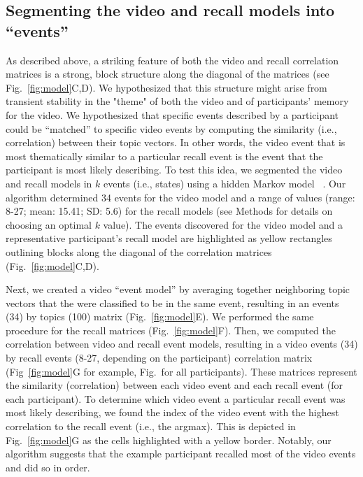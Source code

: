 \subsection*{Segmenting the video and recall models into ``events''}
As described above, a striking feature of both the video and recall correlation matrices is a strong, block structure along the diagonal of the matrices (see Fig.~\ref{fig:model}C,D).  We hypothesized that this structure might arise from transient stability in the "theme" of both the video and of participants' memory for the video. We hypothesized that specific events described by a participant could be ``matched'' to specific video events by computing the similarity (i.e., correlation) between their topic vectors. In other words, the video event that is most thematically similar to a particular recall event is the event that the participant is most likely describing. To test this idea, we segmented the video and recall models in $k$ events (i.e., states) using a hidden Markov model ~\citep{BaldEtal17}. Our algorithm determined 34 events for the video model and a range of values (range: 8-27; mean: 15.41; SD: 5.6) for the recall models (see Methods for details on choosing an optimal $k$ value).  The events discovered for the video model and a representative participant's recall model are highlighted as yellow rectangles outlining blocks along the diagonal of the correlation matrices (Fig.~\ref{fig:model}C,D).

Next, we created a video ``event model'' by averaging together neighboring topic vectors that the were classified to be in the same event, resulting in an events (34) by topics (100) matrix (Fig.~\ref{fig:model}E).  We performed the same procedure for the recall matrices (Fig.~\ref{fig:model}F). Then, we computed the correlation between video and recall event models, resulting in a video events (34) by recall events (8-27, depending on the participant) correlation matrix (Fig~\ref{fig:model}G for example, Fig.~\matchmats for all participants). These matrices represent the similarity (correlation) between each video event and each recall event (for each participant). To determine which video event a particular recall event was most likely describing, we found the index of the video event with the highest correlation to the recall event (i.e., the argmax).  This is depicted in Fig.~\ref{fig:model}G as the cells highlighted with a yellow border. Notably, our algorithm suggests that the example participant recalled most of the video events and did so in order.

